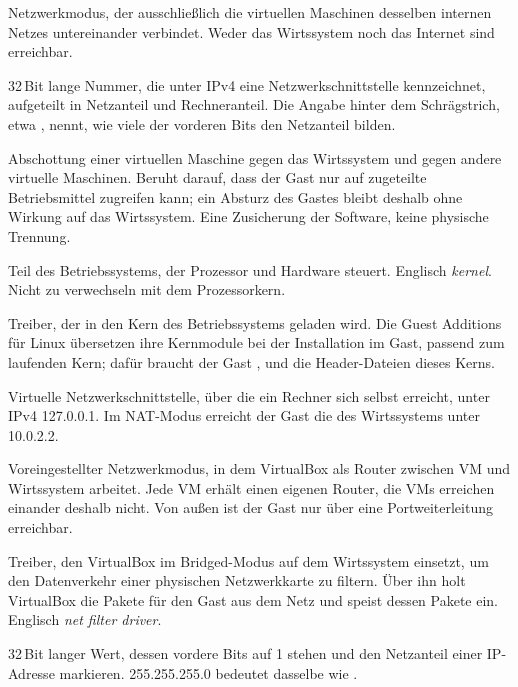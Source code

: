 \begin{glossar}
Netzwerkmodus, der ausschließlich die virtuellen Maschinen desselben internen Netzes untereinander verbindet. Weder das Wirtssystem noch das Internet sind erreichbar.

32\,Bit lange Nummer, die unter IPv4 eine Netzwerkschnittstelle kennzeichnet, aufgeteilt in Netzanteil und Rechneranteil. Die Angabe hinter dem Schrägstrich, etwa , nennt, wie viele der vorderen Bits den Netzanteil bilden.

Abschottung einer virtuellen Maschine gegen das Wirtssystem und gegen andere virtuelle Maschinen. Beruht darauf, dass der Gast nur auf zugeteilte Betriebsmittel zugreifen kann; ein Absturz des Gastes bleibt deshalb ohne Wirkung auf das Wirtssystem. Eine Zusicherung der Software, keine physische Trennung.

Teil des Betriebssystems, der Prozessor und Hardware steuert. Englisch \emph{kernel}. Nicht zu verwechseln mit dem Prozessorkern.

Treiber, der in den Kern des Betriebssystems geladen wird. Die Guest Additions für Linux übersetzen ihre Kernmodule bei der Installation im Gast, passend zum laufenden Kern; dafür braucht der Gast ,  und die Header-Dateien dieses Kerns.

Virtuelle Netzwerkschnittstelle, über die ein Rechner sich selbst erreicht, unter IPv4 127.0.0.1. Im NAT-Modus erreicht der Gast die des Wirtssystems unter 10.0.2.2.

Voreingestellter Netzwerkmodus, in dem VirtualBox als Router zwischen VM und Wirtssystem arbeitet. Jede VM erhält einen eigenen Router, die VMs erreichen einander deshalb nicht. Von außen ist der Gast nur über eine Portweiterleitung erreichbar.

Treiber, den VirtualBox im Bridged-Modus auf dem Wirtssystem einsetzt, um den Datenverkehr einer physischen Netzwerkkarte zu filtern. Über ihn holt VirtualBox die Pakete für den Gast aus dem Netz und speist dessen Pakete ein. Englisch \emph{net filter driver}.

32\,Bit langer Wert, dessen vordere Bits auf 1 stehen und den Netzanteil einer IP-Adresse markieren. 255.255.255.0 bedeutet dasselbe wie .


\end{glossar}
